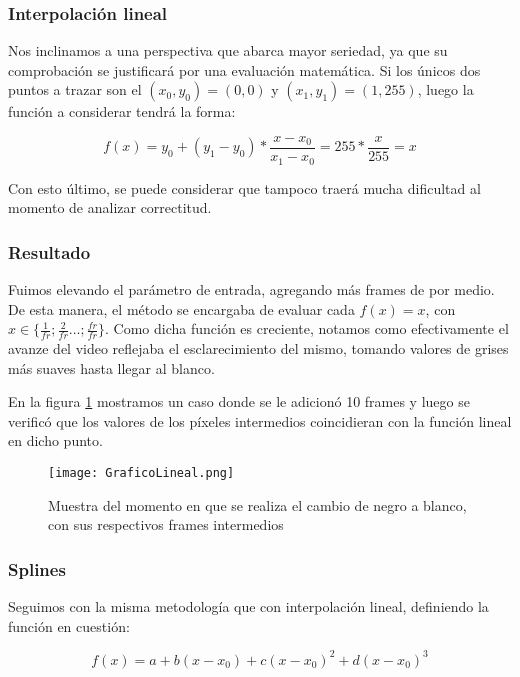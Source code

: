 \subsubsection*{\bf{Interpolaci\'on lineal}}

Nos inclinamos a una perspectiva que abarca mayor seriedad, ya que su comprobaci\'on se justificar\'a por una evaluación matem\'atica. Si los únicos dos puntos a trazar son el $(x_0,y_0) = (0,0)$ y $(x_1,y_1) = (1,255)$, luego la funci\'on a considerar tendr\'a la forma:

$$f(x) = y_0 + (y_1-y_0) * \frac{x - x_0}{x_1 - x_0} = 255 * \frac{x}{255} = x$$

Con esto \'ultimo, se puede considerar que tampoco traer\'a mucha dificultad al momento de analizar correctitud.

\subsubsection*{Resultado}

Fuimos elevando el par\'ametro de entrada, agregando m\'as frames de por medio. De esta manera, el m\'etodo se encargaba de evaluar cada $f(x) = x$, con $x \in \{ \frac{1}{fr} ; \frac{2}{fr} \ldots ; \frac{fr}{fr} \}$. Como dicha funci\'on es creciente, notamos como efectivamente el avanze del video reflejaba el esclarecimiento del mismo, tomando valores de grises m\'as suaves hasta llegar al blanco.

En la figura \ref{fig:linealValidacion} mostramos un caso donde se le adicion\'o 10 frames y luego se verific\'o que los valores de los p\'ixeles intermedios coincidieran con la funci\'on lineal en dicho punto.

\begin{figure}[h!]
  \centering
    \texttt{[image: GraficoLineal.png]}
     \caption{Muestra del momento en que se realiza el cambio de negro a blanco, con sus respectivos frames intermedios}\label{fig:linealValidacion}
\end{figure}
\noindent

\subsubsection*{\bf{Splines}}

Seguimos con la misma metodolog\'ia que con interpolaci\'on lineal, definiendo la funci\'on en cuesti\'on:

$$f(x) = a + b (x - x_0) + c (x - x_0)^2 + d (x - x_0)^3$$

